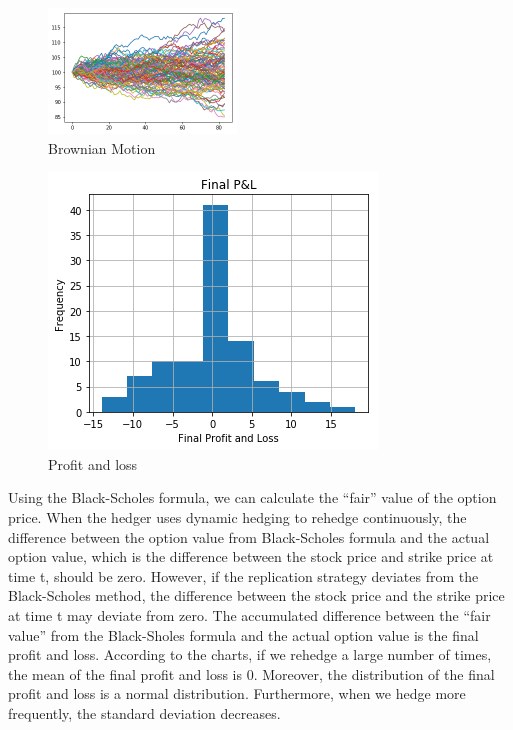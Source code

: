 \documentclass[fleqn,12pt]{SelfArx}
\def\mystyle{decsci}
\begin{document}
\begin{figure}[ht]\centering
	\includegraphics[width=50mm]{Brownian}
	\caption{Brownian Motion}
\end{figure}

\begin{figure}[ht]\centering
	\includegraphics{PL}
	\caption{Profit and loss}
\end{figure}

Using the Black-Scholes formula, we can calculate the “fair” value of the option price. When the hedger uses dynamic hedging to rehedge continuously, the difference between the option value from Black-Scholes formula and the actual option value, which is the difference between the stock price and strike price at time t, should be zero. However, if the replication strategy deviates from the Black-Scholes method, the difference between the stock price and the strike price at time t may deviate from zero. The accumulated difference between the “fair value” from the Black-Sholes formula and the actual option value is the final profit and loss. According to the charts, if we rehedge a large number of times, the mean of the final profit and loss is 0. Moreover, the distribution of the final profit and loss is a normal distribution. Furthermore, when we hedge more frequently, the standard deviation decreases.

\end{document}
